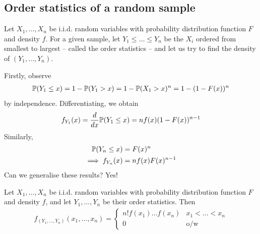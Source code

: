 \documentclass{../template/note}
\begin{document}
    \subsection{Order statistics of a random sample}
    
    Let \(X_1, \dots, X_n\) be i.i.d. random variables with probability distribution function \(F\) and density \(f\). For a given sample, let \(Y_1 \leq \dots \leq Y_n\) be the \(X_i\) ordered from smallest to largest -- called the order statistics -- and let us try to find the density of \((Y_1, \dots, Y_n)\).

    Firstly, observe
    \begin{align*}
        \mathbb P(Y_1 \leq x) = 1 - \mathbb P(Y_1 > x) = 1 - \mathbb P(X_1 > x)^n = 1 - (1-F(x))^n
    \end{align*}
    by independence. Differentiating, we obtain
    \begin{align*}
        f_{Y_1}(x) = \frac d {dx} \mathbb P(Y_1 \leq x) = nf(x)(1-F(x))^{n-1}
    \end{align*}
    Similarly,
    \begin{align*}
        \mathbb P(Y_n \leq x) &= F(x)^n \\
        \implies f_{Y_n}(x) &= nf(x)F(x)^{n-1}
    \end{align*}
    Can we generalise these results? Yes!
    \begin{proposition}
        Let \(X_1, \dots, X_n\) be i.i.d. random variables with probability distribution function \(F\) and density \(f\), and let \(Y_1, \dots, Y_n\) be their order statistics. Then
        \begin{align*}
            f_{(Y_1, \dots, Y_n)}(x_1, \dots, x_n) = \begin{cases}
                n!f(x_1) \dots f(x_n) & x_1 < \dots < x_n \\
                0 & \text{o/w}
            \end{cases}
        \end{align*}
    \end{proposition}
\end{document}
